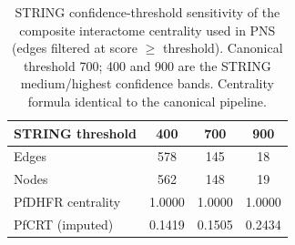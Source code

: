 \begin{table}[htbp]
  \centering
  \caption{STRING confidence-threshold sensitivity of the composite
  interactome centrality used in PNS (edges filtered at score $\geq$ threshold).
  Canonical threshold 700; 400 and 900 are the STRING medium/highest
  confidence bands. Centrality formula identical to the canonical pipeline.}
  \label{tab:string-threshold}
  \begin{tabular}{lccc}
    \toprule
    STRING threshold & \num{400} & \num{700} & \num{900} \\
    \midrule
    Edges & 578 & 145 & 18 \\
    Nodes & 562 & 148 & 19 \\
    PfDHFR centrality & 1.0000 & 1.0000 & 1.0000 \\
    PfCRT (imputed) & 0.1419 & 0.1505 & 0.2434 \\
    \bottomrule
  \end{tabular}
\end{table}
